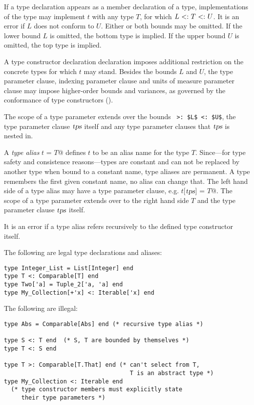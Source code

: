If a type declaration appears as a member declaration of a type, implementations of the type may implement $t$ with any type $T$, for which $L \conforms T \conforms U$. It is an error if $L$ does not conform to $U$. Either or both bounds may be omitted. If the lower bound $L$ is omitted, the bottom type  is implied. If the upper bound $U$ is omitted, the top type  is implied. 

A type constructor declaration declaration imposes additional restriction on the concrete types for which $t$ may stand. Besides the bounds $L$ and $U$, the type parameter clause, indexing parameter clause and units of measure parameter clause may impose higher-order bounds and variances, as governed by the conformance of type constructors ().

The scope of a type parameter extends over the bounds ~\lstinline!>: $L$ <: $U$!, the type parameter clause $\mbox{\sl tps}$ itself and any type parameter clauses that $\mbox{\sl tps}$ is nested in.

A {\em type alias} \lstinline@type $t$ = $T$@ defines $t$ to be an alias name for the type $T$. Since---for type safety and consistence reasons---types are constant and can not be replaced by another type when bound to a constant name, type aliases are permanent. A type remembers the first given constant name, no alias can change that. The left hand side of a type alias may have a type parameter clause, e.g. \lstinline@type $t$[$\mbox{\sl tps}$] = $T$@. The scope of a type parameter extends over to the right hand side $T$ and the type parameter clause $\mbox{\sl tps}$ itself. 

It is an error if a type alias refers recursively to the defined type constructor itself. 

\example The following are legal type declarations and aliases:
\begin{lstlisting}
type Integer_List = List[Integer] end
type T <: Comparable[T] end
type Two['a] = Tuple_2['a, 'a] end
type My_Collection[+'x] <: Iterable['x] end
\end{lstlisting}

The following are illegal:
\begin{lstlisting}
type Abs = Comparable[Abs] end (* recursive type alias *)

type S <: T end  (* S, T are bounded by themselves *)
type T <: S end

type T >: Comparable[T.That] end (* can't select from T,
                                    T is an abstract type *)
type My_Collection <: Iterable end
  (* type constructor members must explicitly state
     their type parameters *)
\end{lstlisting}





